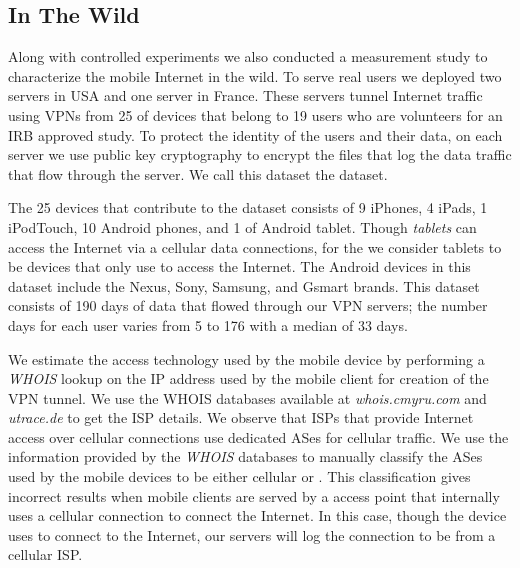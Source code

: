 \subsection{In The Wild}

Along with controlled experiments we also conducted a measurement study to characterize the mobile Internet in the wild.
To serve real users we deployed two servers in USA and one server in France. 
These servers tunnel Internet traffic using VPNs from 25 of devices that belong to 19 users who are volunteers for an IRB approved study.
To protect the identity of the users and their data, on each server we use public key cryptography to encrypt the files that log the data traffic that flow through the server. 
We call this dataset the \moball dataset. 

The 25 devices that contribute to the \moball dataset consists of 9 iPhones, 4 iPads, 1 iPodTouch, 10 Android phones, and 1 of Android tablet.
Though \emph{tablets} can access the Internet via a cellular data connections, for the \moball we consider tablets to be devices that only use \wifi to access the Internet.
The Android devices in this dataset include the Nexus, Sony, Samsung, and Gsmart brands.
This dataset consists of 190 days of data that flowed through our VPN servers; the number days for each user varies from 5 to 176 with a median of 33 days.

We estimate the access technology used by the mobile device by performing a \emph{WHOIS} lookup on the IP address used by the mobile client for creation of the VPN tunnel. 
We use the WHOIS databases available at \emph{whois.cmyru.com} and \emph{utrace.de} to get the ISP details.
We observe that ISPs that provide Internet access over cellular connections use dedicated ASes for cellular traffic. 
We use the information provided by the \emph{WHOIS} databases to manually classify the ASes used by the mobile devices to be either cellular or \wifi.
This classification gives incorrect results when mobile clients are served by a \wifi access point that internally uses a cellular connection to connect the Internet.
In this case, though the device uses \wifi to connect to the Internet, our servers will log the connection to be from a cellular ISP. 


